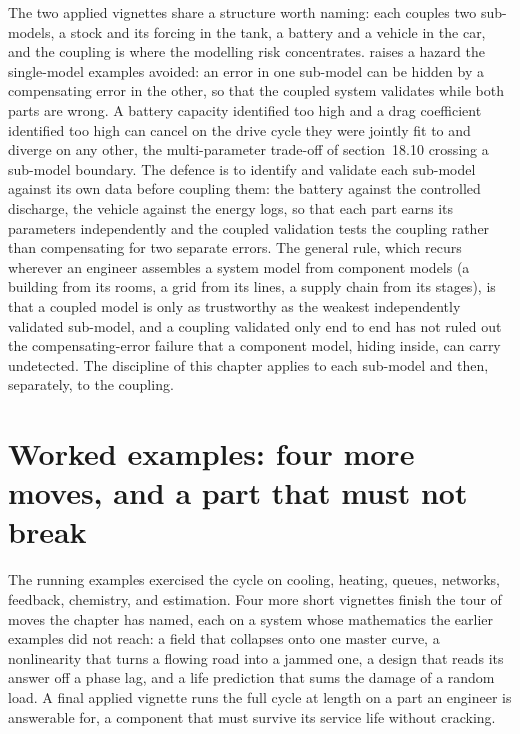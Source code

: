 \begin{mastery}
The two applied vignettes share a structure worth naming: each couples two
sub-models, a stock and its forcing in the tank, a battery and a vehicle in
the car, and the coupling is where the modelling risk concentrates.
 raises a hazard the single-model examples avoided:
an error in one sub-model can be hidden by a compensating error in the
other, so that the coupled system validates while both parts are wrong. A
battery capacity identified too high and a drag coefficient identified too
high can cancel on the drive cycle they were jointly fit to and diverge on
any other, the multi-parameter trade-off of section~18.10 crossing a
sub-model boundary. The defence is to identify and validate each sub-model
against its own data before coupling them: the battery against the
controlled discharge, the vehicle against the energy logs, so that each
part earns its parameters independently and the coupled validation tests the
coupling rather than compensating for two separate errors. The general rule,
which recurs wherever an engineer assembles a system model from component
models (a building from its rooms, a grid from its lines, a supply chain
from its stages), is that a coupled model is only as trustworthy as the
weakest independently validated sub-model, and a coupling validated only end
to end has not ruled out the compensating-error failure that a component
model, hiding inside, can carry undetected. The discipline of this chapter
applies to each sub-model and then, separately, to the coupling.
\end{mastery}

\section{Worked examples: four more moves, and a part that must not break}

The running examples exercised the cycle on cooling, heating, queues,
networks, feedback, chemistry, and estimation. Four more short vignettes
finish the tour of moves the chapter has named, each on a system whose
mathematics the earlier examples did not reach: a field that collapses onto
one master curve, a nonlinearity that turns a flowing road into a jammed one,
a design that reads its answer off a phase lag, and a life prediction that
sums the damage of a random load. A final applied vignette runs the full
cycle at length on a part an engineer is answerable for, a component that must
survive its service life without cracking.

